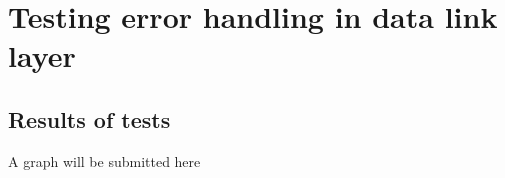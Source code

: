 \section{Testing error handling in data link layer}\label{app:exp:dll_result}


\subsection{Results of tests}
A graph will be submitted here


